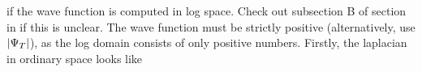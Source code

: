 if the wave function is computed in log space. Check out subsection B of section  in \cite{FermiNet} if this is unclear. The wave function must be strictly positive (alternatively, use $\abs{\Psi_T}$), as the log domain consists of only positive numbers. Firstly, the laplacian in ordinary space looks like 













